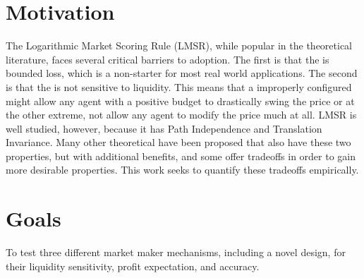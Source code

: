 \section{Motivation}
The Logarithmic Market Scoring Rule (LMSR), while popular in the theoretical
literature, faces several critical barriers to adoption. The first is that
the  is bounded loss, which is a non-starter for most
real world applications. The second is that the  is not
sensitive to liquidity. This means that a improperly configured 
might allow any agent with a positive budget to drastically swing the price or at
the other extreme, not allow any agent to modify the price much at all. LMSR is
well studied, however, because it has Path Independence and Translation Invariance.
Many other theoretical  have been proposed that also have
these two properties, but with additional benefits, and some offer tradeoffs in
order to gain more desirable properties. This work seeks to quantify these
tradeoffs empirically.

\section{Goals}
To test three different market maker mechanisms, including a novel design, for their liquidity sensitivity, profit expectation, and accuracy. 